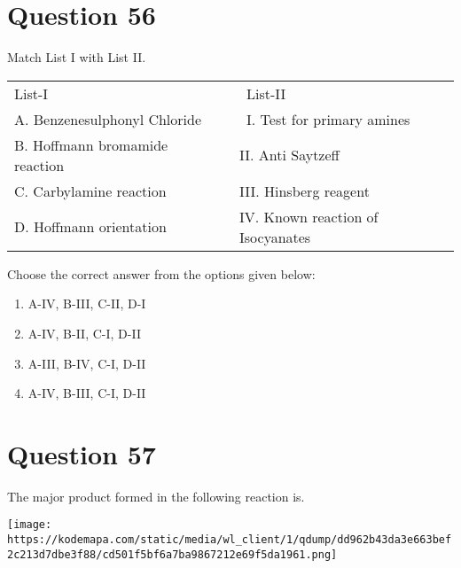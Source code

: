 \documentclass{article}
\begin{document}
\section*{Question 56}
Match List I with List II.



\begin{longtable}[]{@{}ll@{}}

\toprule\noalign{}

\endhead

\bottomrule\noalign{}

\endlastfoot

List-I~~ & ~List-II~ \\

A. Benzenesulphonyl Chloride & ~I. Test for primary amines~ \\

B. Hoffmann bromamide reaction~~ & II. Anti Saytzeff~~ \\

C. Carbylamine reaction~ & III. Hinsberg reagent~ \\

D. Hoffmann orientation~ & IV. Known reaction of Isocyanates~ \\

\end{longtable}



Choose the correct answer from the options given below:\\


\begin{enumerate}[label=(\alph*)]
\item A-IV, B-III, C-II, D-I


\item A-IV, B-II, C-I, D-II


\item A-III, B-IV, C-I, D-II


\item A-IV, B-III, C-I, D-II


\end{enumerate}
\newpage
\section*{Question 57}
The major product formed in the following reaction is.



\texttt{[image: https://kodemapa.com/static/media/wl\_client/1/qdump/dd962b43da3e663bef2c213d7dbe3f88/cd501f5bf6a7ba9867212e69f5da1961.png]}\\
\end{document}
